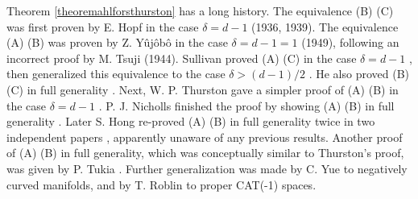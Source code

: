 \begin{remark}
Theorem \ref{theoremahlforsthurston} has a long history. The equivalence (B) \iff (C) was first proven by E. Hopf in the case $\delta = d - 1$ \cite{Hopf_fuchsian, Hopf_statistik} (1936, 1939). The equivalence (A) \iff (B) was proven by Z. Y\^uj\^ob\^o in the case $\delta = d - 1 = 1$ \cite{Yujobo} (1949), following an incorrect proof by M. Tsuji \cite{Tsuji_multiply_connected} (1944). Sullivan proved (A) \iff (C) in the case $\delta = d - 1$ \cite[Theorem II]{Sullivan_ergodic_theory_at_infinity}, then generalized this equivalence to the case $\delta > (d - 1)/2$ \cite[Theorem 32]{Sullivan_density_at_infinity}. He also proved (B) \iff (C) in full generality \cite[Theorem 21]{Sullivan_density_at_infinity}. Next, W. P. Thurston gave a simpler proof of (A) \implies (B) in the case $\delta = d - 1$ \cite[Theorem 4 of Section VII]{Ahlfors}. P. J. Nicholls finished the proof by showing (A) \iff (B) in full generality \cite[Theorems 8.2.2 and 8.2.3]{Nicholls}. Later S. Hong re-proved (A) \implies (B) in full generality twice in two independent papers \cite{Hong1,Hong2}, apparently unaware of any previous results. Another proof of (A) \implies (B) in full generality, which was conceptually similar to Thurston's proof, was given by P. Tukia \cite[Theorem 3A]{Tukia}. Further generalization was made by C. Yue \cite{Yue} to negatively curved manifolds, and by T. Roblin \cite[Th\'eor\`eme 1.7]{Roblin1} to proper CAT(-1) spaces.
\end{remark}



